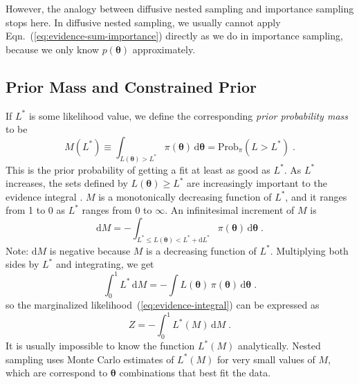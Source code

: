 \documentclass[letterpaper, preprint]{aastex}
\newcommand{\bth} {\boldsymbol \theta}
\newcommand{\md}{\mathrm{d}}
\begin{document}
However, the analogy between diffusive nested sampling and importance sampling stops here. In diffusive nested sampling, we usually cannot apply Eqn.~(\ref{eq:evidence-sum-importance}) directly as we do in importance sampling, because we only know $p(\bth)$ approximately.

\subsection{Prior Mass and Constrained Prior}
If $L^*$ is some likelihood value, we define the corresponding {\em prior probability mass} to be
\begin{equation}
M(L^*) \equiv \int_{L(\bth)>L^*}\!\pi(\bth)\,\md\bth = \mathrm{Prob}_\pi(L>L^*)\; .
 \label{eq:prior-mass}
\end{equation}
This is the prior probability of getting a fit at least as good as $L^*$.
As $L^*$ increases, the sets defined by $L(\bth)\geq L^*$ are increasingly important to the 
evidence integral \citep{skilling06a}. 
$M$ is a monotonically decreasing function of $L^*$, and it ranges from 1 to 0
as $L^*$ ranges from 0 to $\infty$. 
An infinitesimal increment of $M$ is
\begin{equation}
\mathrm{d}M=-\int_{L^*\leq L(\bth)<L^*+\mathrm{d}L^*}\!\pi(\bth)\,\mathrm{d}\bth \; .
\label{eq:dM}
\end{equation}
Note: $\mathrm{d}M$ is negative because $M$ is a decreasing function of $L^*$.
Multiplying both sides by $L^*$ and integrating, we get
\begin{equation}
\int^1_0\! L^*\,\mathrm{d}M=-\int\!L(\bth)\,\pi(\bth)\,\mathrm{d}\bth\; .
\label{eq:int-dM}
\end{equation}
so the marginalized likelihood~(\ref{eq:evidence-integral}) can be expressed as
\begin{equation}
Z=-\int^1_0\! L^*(M)\,\mathrm{d}M \;.
 \label{eq:evidence-prior-mass}
\end{equation}
It is usually impossible to know the function $L^*(M)$ analytically. 
Nested sampling uses Monte Carlo estimates of $L^*(M)$ for very small values of $M$, which are 
correspond to $\bth$ combinations that best fit the data.
\end{document}

